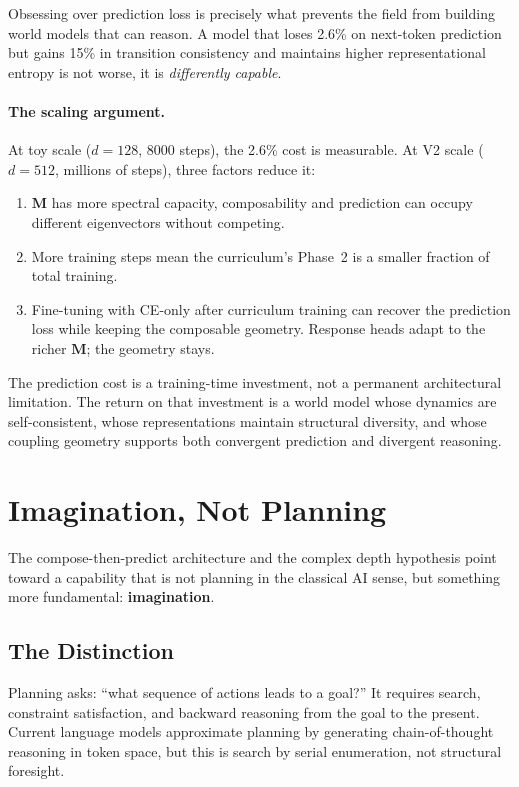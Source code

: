 \documentclass[11pt, a4paper]{article}
\newcommand{\M}{\mathbf{M}}
\theoremstyle{plain}
\theoremstyle{definition}
\theoremstyle{remark}
\begin{document}
Obsessing over prediction loss is precisely what prevents the field from building world models that can reason.
A model that loses 2.6\% on next-token prediction but gains 15\% in transition consistency and maintains higher representational entropy is not worse, it is \emph{differently capable}.

\paragraph{The scaling argument.}
At toy scale ($d{=}128$, 8000 steps), the 2.6\% cost is measurable.
At V2 scale ($d{=}512$, millions of steps), three factors reduce it:
\begin{enumerate}[nosep]
    \item $\M$ has more spectral capacity, composability and prediction can occupy different eigenvectors without competing.
    \item More training steps mean the curriculum's Phase~2 is a smaller fraction of total training.
    \item Fine-tuning with CE-only after curriculum training can recover the prediction loss while keeping the composable geometry.
    Response heads adapt to the richer $\M$; the geometry stays.
\end{enumerate}

The prediction cost is a training-time investment, not a permanent architectural limitation.
The return on that investment is a world model whose dynamics are self-consistent, whose representations maintain structural diversity, and whose coupling geometry supports both convergent prediction and divergent reasoning.

\section{Imagination, Not Planning}\label{sec:imagination}

The compose-then-predict architecture and the complex depth hypothesis point toward a capability that is not planning in the classical AI sense, but something more fundamental: \textbf{imagination}.

\subsection{The Distinction}

Planning asks: ``what sequence of actions leads to a goal?''
It requires search, constraint satisfaction, and backward reasoning from the goal to the present.
Current language models approximate planning by generating chain-of-thought reasoning in token space, but this is search by serial enumeration, not structural foresight.
\end{document}
